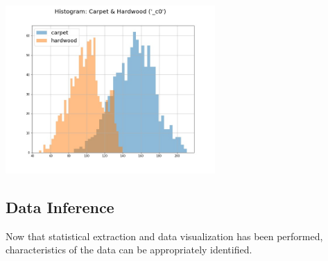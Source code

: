 \documentclass[a4paper,12pt]{IEEEtran}
\begin{document}
\includegraphics[width=8cm]{carpethardwood_hist01}

\subsection{Data Inference}
\label{sec3}
Now that statistical extraction and data visualization has been performed, characteristics of the data can be appropriately identified.
\end{document}

